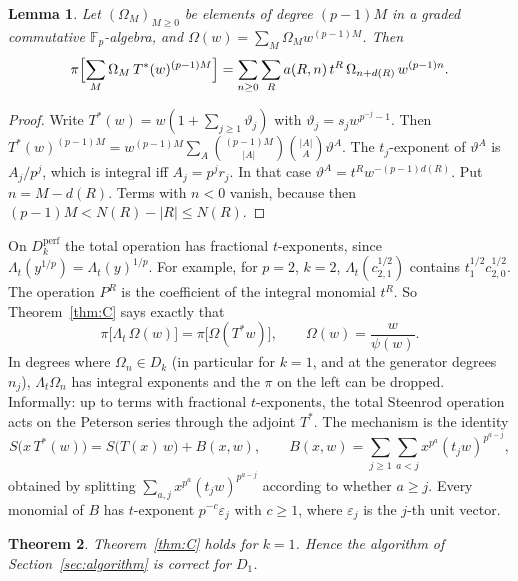 \documentclass[11pt]{amsart}
\newtheorem{theorem}{Theorem}[section]
\newtheorem{lemma}[theorem]{Lemma}
\theoremstyle{definition}
\theoremstyle{remark}
\newcommand{\F}{\mathbb{F}_p}
\newcommand{\Dk}{D_k}
\newcommand{\Dperf}{D_k^{\mathrm{perf}}}
\begin{document}
\begin{lemma}\label{lem:G}
Let $(\Omega_M)_{M\ge0}$ be elements of degree $(p-1)M$ in a graded
commutative $\F$-algebra, and $\Omega(w)=\sum_M\Omega_Mw^{(p-1)M}$.  Then
\[
  \pi\Bigl[\sum_M\Omega_M\,T^*(w)^{(p-1)M}\Bigr]=\sum_{n\ge0}\sum_R a(R,n)\,t^R\,\Omega_{n+d(R)}\,w^{(p-1)n}.
\]
\end{lemma}

\begin{proof}
Write $T^*(w)=w(1+\sum_{j\ge1}\vartheta_j)$ with
$\vartheta_j=s_jw^{p^{-j}-1}$.  Then
$T^*(w)^{(p-1)M}=w^{(p-1)M}\sum_A\binom{(p-1)M}{|A|}\binom{|A|}{A}\vartheta^A$.
The $t_j$-exponent of $\vartheta^A$ is $A_j/p^j$, which is integral iff
$A_j=p^jr_j$.  In that case $\vartheta^A=t^Rw^{-(p-1)d(R)}$.  Put
$n=M-d(R)$.  Terms with $n<0$ vanish, because then
$(p-1)M<N(R)-|R|\le N(R)$.
\end{proof}

On $\Dperf$ the total operation has fractional $t$-exponents, since
$\Lambda_t(y^{1/p})=\Lambda_t(y)^{1/p}$.  For example, for $p=2$, $k=2$,
$\Lambda_t(c_{2,1}^{1/2})$ contains $t_1^{1/2}c_{2,0}^{1/2}$.  The operation $P^R$
is the coefficient of the integral monomial $t^R$.  So Theorem~\ref{thm:C}
says exactly that
\begin{equation}\label{eq:F2}
  \pi\bigl[\Lambda_t\,\Omega(w)\bigr]=\pi\bigl[\Omega(T^*w)\bigr],\qquad \Omega(w)=\frac{w}{\psi(w)} .
\end{equation}
In degrees where $\Omega_n\in\Dk$ (in particular for $k=1$, and at the generator
degrees $n_j$), $\Lambda_t\Omega_n$ has integral exponents and the $\pi$ on the
left can be dropped.  Informally: up to terms with fractional $t$-exponents, the total Steenrod
operation acts on the Peterson series through the adjoint $T^*$.  The
mechanism is the identity
\begin{equation}\label{eq:adj}
  S\bigl(x\,T^*(w)\bigr)=S\bigl(T(x)\,w\bigr)+B(x,w),\qquad
  B(x,w)=\sum_{j\ge1}\sum_{a<j}x^{p^a}(t_jw)^{p^{a-j}},
\end{equation}
obtained by splitting $\sum_{a,j}x^{p^a}(t_jw)^{p^{a-j}}$ according to whether
$a\ge j$.  Every monomial of $B$ has $t$-exponent $p^{-c}\varepsilon_j$ with
$c\ge1$, where $\varepsilon_j$ is the $j$-th unit vector.

\begin{theorem}\label{thm:k1}
Theorem~\ref{thm:C} holds for $k=1$.  Hence the algorithm
of Section~\ref{sec:algorithm} is correct for $D_1$.
\end{theorem}
\end{document}
